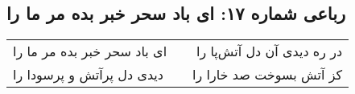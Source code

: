 \begin{center}
\section*{رباعی شماره ۱۷: ای باد سحر خبر بده مر ما را}
\label{sec:0017}
\begin{longtable}{l p{0.5cm} r}
ای باد سحر خبر بده مر ما را
&&
در ره دیدی آن دل آتش‌پا را
\\
دیدی دل پرآتش و پرسودا را
&&
کز آتش بسوخت صد خارا را
\\
\end{longtable}
\end{center}
